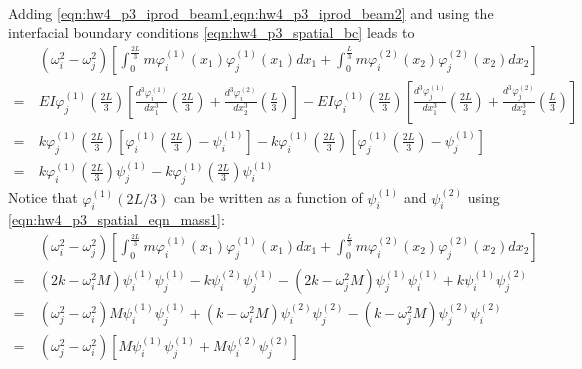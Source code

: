 \begin{prf}{}
\begin{subequations}
\begin{equation}
\begin{aligned}
\end{aligned}
\end{equation}
\end{subequations}
Adding \cref{eqn:hw4_p3_iprod_beam1,eqn:hw4_p3_iprod_beam2} and using the interfacial boundary conditions \cref{eqn:hw4_p3_spatial_bc} leads to
\begin{equation}
\begin{aligned}
    &~ \left(\omega_i^2 - \omega_j^2\right)\left[\int_0^\frac{2L}{3} m \varphi_i^{(1)}(x_1) \varphi_j^{(1)}(x_1) dx_1 + \int_0^\frac{L}{3} m \varphi_i^{(2)}(x_2) \varphi_j^{(2)}(x_2) dx_2\right] \\
    =&~
    EI\varphi_j^{(1)}\left(\frac{2L}{3}\right)\left[\frac{d^3 \varphi_i^{(1)}}{dx_1^3}\left(\frac{2L}{3}\right) + \frac{d^3 \varphi_i^{(2)}}{dx_2^3}\left(\frac{L}{3}\right)\right] - 
    EI\varphi_i^{(1)}\left(\frac{2L}{3}\right)\left[\frac{d^3 \varphi_j^{(1)}}{dx_1^3}\left(\frac{2L}{3}\right) + \frac{d^3 \varphi_j^{(2)}}{dx_2^3}\left(\frac{L}{3}\right)\right] \\
    =&~
    k\varphi_j^{(1)}\left(\frac{2L}{3}\right) \left[\varphi_i^{(1)}\left(\frac{2L}{3}\right) - \psi_i^{(1)}\right] - 
    k\varphi_i^{(1)}\left(\frac{2L}{3}\right) \left[\varphi_j^{(1)}\left(\frac{2L}{3}\right) - \psi_j^{(1)}\right] \\
    =&~
    k\varphi_i^{(1)}\left(\frac{2L}{3}\right) \psi_j^{(1)} - k\varphi_j^{(1)}\left(\frac{2L}{3}\right) \psi_i^{(1)}
\end{aligned}
\end{equation}
Notice that $\varphi_i^{(1)}(2L/3)$ can be written as a function of $\psi_i^{(1)}$ and $\psi_i^{(2)}$ using \cref{eqn:hw4_p3_spatial_eqn_mass1}:
\begin{equation}
\begin{aligned}
    &~ \left(\omega_i^2 - \omega_j^2\right)\left[\int_0^\frac{2L}{3} m \varphi_i^{(1)}(x_1) \varphi_j^{(1)}(x_1) dx_1 + \int_0^\frac{L}{3} m \varphi_i^{(2)}(x_2) \varphi_j^{(2)}(x_2) dx_2\right] \\
    =&~
    (2k - \omega_i^2 M)\psi_i^{(1)} \psi_j^{(1)} - k \psi_i^{(2)} \psi_j^{(1)} - 
    (2k - \omega_j^2 M)\psi_j^{(1)} \psi_i^{(1)} + k \psi_i^{(1)} \psi_j^{(2)}\\
    =&~
    \left(\omega_j^2 - \omega_i^2\right)M\psi_i^{(1)} \psi_j^{(1)} + (k - \omega_i^2 M) \psi_i^{(2)} \psi_j^{(2)} - (k - \omega_j^2 M) \psi_j^{(2)} \psi_i^{(2)} \\
    =&~ 
    \left(\omega_j^2 - \omega_i^2\right) 
    \left[M\psi_i^{(1)} \psi_j^{(1)} + M\psi_i^{(2)} \psi_j^{(2)}\right]    

\end{aligned}
\end{equation}
\end{prf}
